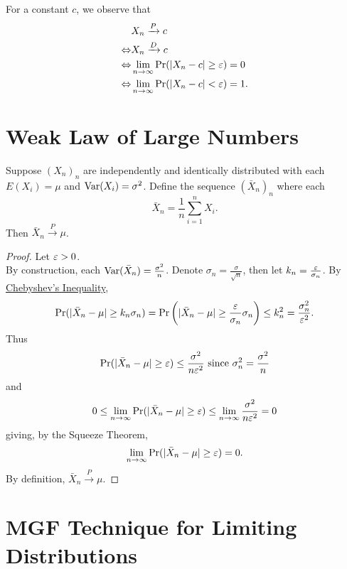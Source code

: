 \documentclass[11pt,fleqn]{book} %
\begin{document}
\begin{remark} \label{rmk:424}
For a constant \(c\), we observe that
\[
\begin{aligned}
& X_n \xrightarrow{P} c \\
\Leftrightarrow &X_n \xrightarrow{D} c \\
\Leftrightarrow &\lim_{n\rightarrow\infty}\Pr(|X_n - c| \geq \varepsilon) = 0 \\
\Leftrightarrow &\lim_{n\rightarrow\infty}\Pr(|X_n - c| < \varepsilon) = 1.
\end{aligned}
\]
\end{remark}


\section{Weak Law of Large Numbers}

\begin{theorem}
\label{thm:431}
Suppose \((X_n)_n\) are independently and identically distributed with each \(E(X_i) = \mu\) and \(\operatorname{Var}(X_i) = \sigma^2\). Define the sequence \((\bar{X}_n)_n\) where each
\[
\bar{X}_n = \frac1n\sum_{i=1}^nX_i.
\]
\indent Then \(\bar{X}_n\xrightarrow{P}\mu\).
\end{theorem}
\begin{proof} Let \(\varepsilon > 0\).\\
\indent By construction, each \(\operatorname{Var}(\bar{X}_n) = \frac{\sigma^2}{n}\). Denote \(\sigma_n = \frac{\sigma}{\sqrt{n}}\), then let \(k_n = \frac{\varepsilon}{\sigma_n}\). By \hyperref[cor:184]{Chebyshev's Inequality}, 
\[
\Pr(|\bar{X}_n - \mu| \geq k_n\sigma_n) = \Pr\left(|\bar{X}_n - \mu| \geq \frac{\varepsilon}{\sigma_n}\sigma_n\right) \leq k_n^2 = \frac{\sigma_n^2}{\varepsilon^2}.
\]
\indent Thus
\[
\Pr(|\bar{X}_n - \mu| \geq \varepsilon) \leq \frac{\sigma^2}{n\varepsilon^2} \text{ since } \sigma_n^2 = \frac{\sigma^2}{n}
\]
and
\[
0 \leq \lim_{n\rightarrow\infty}\Pr(|\bar{X}_n - \mu|\geq\varepsilon) \leq \lim_{n\rightarrow\infty}\frac{\sigma^2}{n\varepsilon^2} = 0
\]
giving, by the Squeeze Theorem,
\[
\lim_{n\rightarrow\infty}\Pr(|\bar{X}_n - \mu|\geq\varepsilon) = 0.
\]
\indent By definition, \(\bar{X}_n\xrightarrow{P}\mu\).
\end{proof}


\section{MGF Technique for Limiting Distributions}
\end{document}
